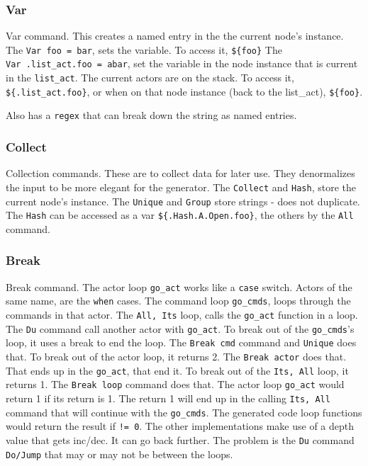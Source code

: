 \documentclass[11pt]{article}
\begin{document}
\subsubsection{Var}
Var command.
This creates a named entry in the the current node's instance. The
\texttt{Var\ foo\ =\ bar}, sets the variable. To access it,
\texttt{\$\{foo\}} The \texttt{Var\ .list\_act.foo\ =\ abar}, set the
variable in the node instance that is current in the \texttt{list\_act}.
The current actors are on the stack. To access it,
\texttt{\$\{.list\_act.foo\}}, or when on that node instance (back to
the list\_act), \texttt{\$\{foo\}}.

Also has a \texttt{regex} that can break down the string as named
entries.
\subsubsection{Collect}
Collection commands.
These are to collect data for later use. They denormalizes the input to
be more elegant for the generator. The \texttt{Collect} and
\texttt{Hash}, store the current node's instance. The \texttt{Unique}
and \texttt{Group} store strings - does not duplicate. The \texttt{Hash}
can be accessed as a var \texttt{\$\{.Hash.A.Open.foo\}}, the others by
the \texttt{All} command.
\subsubsection{Break}
Break command.
The actor loop \texttt{go\_act} works like a \texttt{case} switch.
Actors of the same name, are the \texttt{when} cases. The command loop
\texttt{go\_cmds}, loops through the commands in that actor. The
\texttt{All,\ Its} loop, calls the \texttt{go\_act} function in a loop.
The \texttt{Du} command call another actor with \texttt{go\_act}. To
break out of the \texttt{go\_cmds}'s loop, it uses a break to end the
loop. The \texttt{Break\ cmd} command and \texttt{Unique} does that. To
break out of the actor loop, it returns 2. The \texttt{Break\ actor}
does that. That ends up in the \texttt{go\_act}, that end it. To break
out of the \texttt{Its,\ All} loop, it returns 1. The
\texttt{Break\ loop} command does that. The actor loop \texttt{go\_act}
would return 1 if its return is 1. The return 1 will end up in the
calling \texttt{Its,\ All} command that will continue with the
\texttt{go\_cmds}. The generated code loop functions would return the
result if \texttt{!=\ 0}. The other implementations make use of a depth
value that gets inc/dec. It can go back further. The problem is the
\texttt{Du} command \texttt{Do/Jump} that may or may not be between the
loops.
\end{document}
